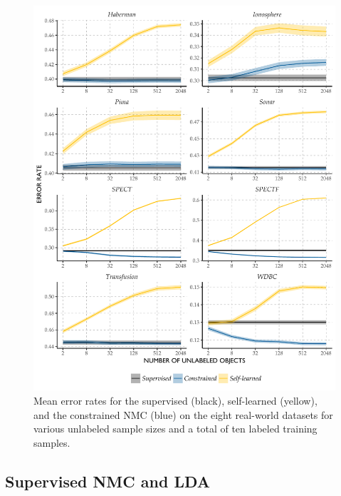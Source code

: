 \documentclass[twoside]{memoir}\usepackage[]{graphicx}\usepackage{xcolor}
\makeatletter
\def\maxwidth{ %
  \ifdim\Gin@nat@width>\linewidth
    \linewidth
  \else
    \Gin@nat@width
  \fi
}
\newenvironment{knitrout}{}{} %
\makeatother
\begin{document}
\begin{knitrout}
\color{fgcolor}\begin{figure}
\includegraphics[width=\maxwidth]{figure/oneprime-1} \caption[Mean error rates for the supervised (black), self-learned (yellow), and the constrained NMC (blue) on the eight real-world datasets for various unlabeled sample sizes and a total of ten labeled training samples]{Mean error rates for the supervised (black), self-learned (yellow), and the constrained NMC (blue) on the eight real-world datasets for various unlabeled sample sizes and a total of ten labeled training samples.}\label{fig:oneprime}
\end{figure}


\end{knitrout}

\subsection{Supervised NMC and LDA}
\end{document}

